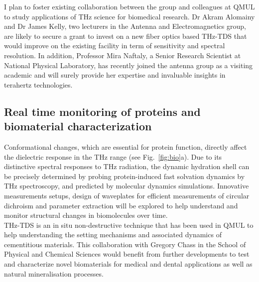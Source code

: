 \documentclass[11pt]{academia}
\begin{document}
I plan to foster existing collaboration between the group and colleagues 
at QMUL to study applications of THz science for biomedical research. 
Dr Akram Alomainy and Dr James Kelly, two lecturers in the Antenna
and Electromagnetics group, are likely to secure a grant to invest 
on a new fiber optics based THz-TDS that would improve on the existing facility 
in term of sensitivity and spectral resolution. 
In addition, Professor Mira Naftaly, a Senior Research Scientist at National Physical Laboratory, 
has recently joined the antenna group as a visiting academic and will 
surely provide her expertise and invaluable insights in terahertz technologies.



\subsection{Real time monitoring of proteins and biomaterial characterization}
Conformational changes, which are essential
for protein function, directly affect the dielectric response in the THz range (see Fig.~\ref{fig:bio}a). 
Due to its distinctive spectral responses to THz radiation, the dynamic hydration shell can
be precisely determined by probing protein-induced fast solvation dynamics by 
THz spectroscopy, and predicted by molecular dynamics simulations\autocite{sushkoTerahertzSpectralDomain2013}. 
Innovative measurements setups, design of waveplates for efficient 
measurements of circular dichroism\autocite{chengQuasiOpticalSubTHzCircular2020} 
and parameter extraction will be explored 
to help understand and monitor structural changes in biomolecules over time.\\
THz-TDS is an in situ non-destructive technique that has been used in QMUL to 
help understanding the setting mechanisms and associated dynamics of cementitious
materials\autocite{tianAtomicVibrationalOrigins2015}. 
This collaboration with Gregory Chass in the School of Physical and Chemical Sciences 
would benefit from further developments to test and characterize novel biomaterials for 
medical and dental applications as well as natural mineralisation processes.
\end{document}
